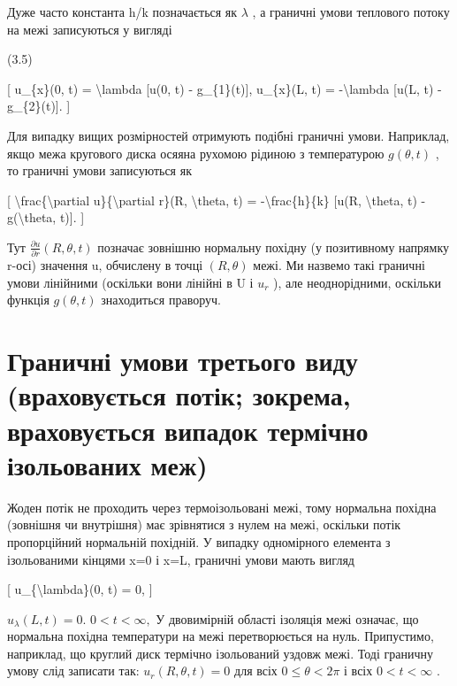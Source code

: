 \documentclass[
]{article}
\begin{document}
Дуже часто константа h/k позначається як \(\lambda\) , а граничні умови
теплового потоку на межі записуються у вигляді

(3.5)

{[} u\_\{x\}(0, t) = \textbackslash lambda {[}u(0, t) - g\_\{1\}(t){]},
u\_\{x\}(L, t) = -\textbackslash lambda {[}u(L, t) - g\_\{2\}(t){]}. {]}

Для випадку вищих розмірностей отримують подібні граничні умови.
Наприклад, якщо межа кругового диска осяяна рухомою рідиною з
температурою \(g(\theta,t)\) , то граничні умови записуються як

{[} \textbackslash frac\{\textbackslash partial
u\}\{\textbackslash partial r\}(R, \textbackslash theta, t) =
-\textbackslash frac\{h\}\{k\} {[}u(R, \textbackslash theta, t) -
g(\textbackslash theta, t){]}. {]}

Тут \(\frac{\partial u}{\partial r}(R, \theta, t)\) позначає зовнішню
нормальну похідну (у позитивному напрямку r-осі) значення u, обчислену в
точці \((R, \theta)\) межі. Ми назвемо такі граничні умови лінійними
(оскільки вони лінійні в U і \(u_r\) ), але неоднорідними, оскільки
функція \(g(\theta, t)\) знаходиться праворуч.

\section{Граничні умови третього виду (враховується потік; зокрема,
враховується випадок термічно ізольованих
меж)}\label{ux433ux440ux430ux43dux438ux447ux43dux456-ux443ux43cux43eux432ux438-ux442ux440ux435ux442ux44cux43eux433ux43e-ux432ux438ux434ux443-ux432ux440ux430ux445ux43eux432ux443ux454ux442ux44cux441ux44f-ux43fux43eux442ux456ux43a-ux437ux43eux43aux440ux435ux43cux430-ux432ux440ux430ux445ux43eux432ux443ux454ux442ux44cux441ux44f-ux432ux438ux43fux430ux434ux43eux43a-ux442ux435ux440ux43cux456ux447ux43dux43e-ux456ux437ux43eux43bux44cux43eux432ux430ux43dux438ux445-ux43cux435ux436}

Жоден потік не проходить через термоізольовані межі, тому нормальна
похідна (зовнішня чи внутрішня) має зрівнятися з нулем на межі, оскільки
потік пропорційний нормальній похідній. У випадку одномірного елемента з
ізольованими кінцями x=0 і x=L, граничні умови мають вигляд

{[} u\_\{\textbackslash lambda\}(0, t) = 0, {]}

\(u_{\lambda}(L, t) = 0.\) \(0 < t < \infty,\) У двовимірній області
ізоляція межі означає, що нормальна похідна температури на межі
перетворюється на нуль. Припустимо, наприклад, що круглий диск термічно
ізольований уздовж межі. Тоді граничну умову слід записати так:
\(u_r(R, \theta, t) = 0\) для всіх \(0 \le \theta < 2\pi\) і всіх
\(0 < t < \infty\) .
\end{document}
